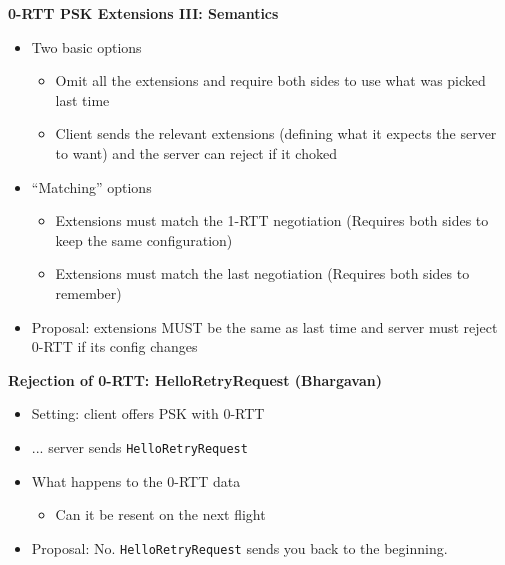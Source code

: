 \documentclass[helvetica]{seminar}
\newcommand{\heading}[1]{%
  \begin{center} 
    \large\bf 
    #1 
  \end{center} 
  \vspace{.4 in}}
\begin{document}
\begin{slide}
\heading{0-RTT PSK Extensions III: Semantics}

\vspace{-2ex}
\begin{itemize}
\item Two basic options
  \begin{itemize}
  \item Omit all the extensions and require both sides to use what was picked last time
  \item Client sends the relevant extensions (defining what it expects the server to want)
    and the server can reject if it choked
  \end{itemize}

\item ``Matching'' options
  \begin{itemize}
  \item Extensions must match the 1-RTT negotiation (Requires both sides to keep the same configuration)
  \item Extensions must match the last negotiation (Requires both sides to remember)
  \end{itemize}

\item Proposal: extensions MUST be the same as last time and server must reject 0-RTT if its config changes
\end{itemize}

\end{slide}


\begin{slide}
\heading{Rejection of 0-RTT: HelloRetryRequest (Bhargavan)}

\begin{itemize}
\item Setting: client offers PSK with 0-RTT
\item ... server sends \verb^HelloRetryRequest^
\item What happens to the 0-RTT data
  \begin{itemize}
  \item Can it be resent on the next flight
  \end{itemize}

\item Proposal: No. \verb^HelloRetryRequest^ sends you back to the beginning.
\end{itemize}
\end{slide}
\end{document}
